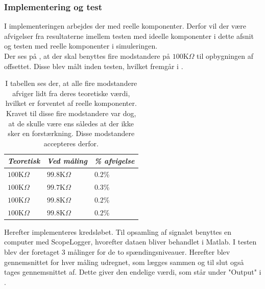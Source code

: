 \subsubsection{Implementering og test}
I implementeringen arbejdes der med reelle komponenter. Derfor vil der være afvigelser fra resultaterne imellem testen med ideelle komponenter i dette afsnit og testen med reelle komponenter i simuleringen. \\
Der ses på , at der skal benyttes fire modstandere på $100$K$\Omega$ til opbygningen af offsettet. Disse blev målt inden testen, hvilket fremgår i .
\begin{table}[H]
	\centering
	\begin{tabular}{|l|l|l|}
		\hline
		\textit{Teoretisk} & \textit{Ved måling} & \textit{\% afvigelse} \\ \hline
		$100$K$\Omega$       & $99.8$K$\Omega$       & $0.2$\%               \\ \hline
		$100$K$\Omega$       & $99.7$K$\Omega$       & $0.3$\%               \\ \hline
		$100$K$\Omega$       & $99.8$K$\Omega$       & $0.2$\%               \\ \hline
		$100$K$\Omega$       & $99.8$K$\Omega$       & $0.2$\%               \\ \hline
	\end{tabular}
	\caption{I tabellen ses der, at alle fire modstandere afviger lidt fra deres teoretiske værdi, hvilket er forventet af reelle komponenter. Kravet til disse fire modstandere var dog, at de skulle være ens således at der ikke sker en forstærkning. Disse modstandere accepteres derfor.}
	\label{Tab:modstand_offset}
\end{table}
\noindent Herefter implementeres kredsløbet. Til opsamling af signalet benyttes en computer med ScopeLogger, hvorefter dataen bliver behandlet i Matlab. I testen blev der foretaget 3 målinger for de to spændingsniveauer. Herefter blev gennemsnittet for hver måling udregnet, som lægges sammen og til slut også tages gennemsnittet af. Dette giver den endelige værdi, som står under "Output" i .
